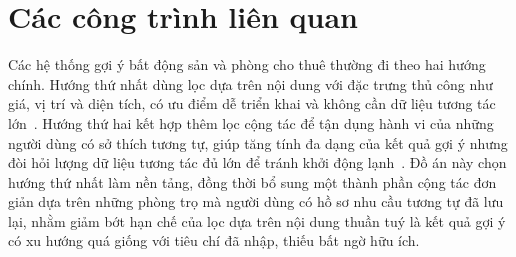 \section{Các công trình liên quan}

Các hệ thống gợi ý bất động sản và phòng cho thuê thường đi theo hai hướng
chính. Hướng thứ nhất dùng lọc dựa trên nội dung với đặc trưng thủ công như
giá, vị trí và diện tích, có ưu điểm dễ triển khai và không cần dữ liệu
tương tác lớn~\cite{RussellNorvig2021}. Hướng thứ hai kết hợp thêm lọc cộng
tác để tận dụng hành vi của những người dùng có sở thích tương tự, giúp
tăng tính đa dạng của kết quả gợi ý nhưng đòi hỏi lượng dữ liệu tương tác đủ
lớn để tránh khởi động lạnh~\cite{HoangKiem}. Đồ án này chọn hướng thứ nhất
làm nền tảng, đồng thời bổ sung một thành phần cộng tác đơn giản dựa trên
những phòng trọ mà người dùng có hồ sơ nhu cầu tương tự đã lưu lại, nhằm
giảm bớt hạn chế của lọc dựa trên nội dung thuần tuý là kết quả gợi ý có xu
hướng quá giống với tiêu chí đã nhập, thiếu bất ngờ hữu ích.
